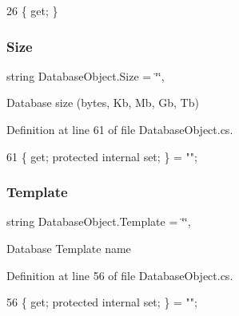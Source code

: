 \begin{DoxyCode}
26 \{ \textcolor{keyword}{get}; \}
\end{DoxyCode}
\mbox{\label{class_database_object_ad86f5dd95a9debdef284e21e32936e9e}} 
\subsubsection{\texorpdfstring{Size}{Size}}
{\footnotesize\ttfamily string Database\+Object.\+Size = \char`\"{}\char`\"{}\hspace{0.3cm}{\ttfamily [get]}, {\ttfamily [set]}}



Database size (bytes, Kb, Mb, Gb, Tb) 



Definition at line 61 of file Database\+Object.\+cs.


\begin{DoxyCode}
61 \{ \textcolor{keyword}{get}; \textcolor{keyword}{protected} \textcolor{keyword}{internal} \textcolor{keyword}{set}; \} = \textcolor{stringliteral}{""};
\end{DoxyCode}
\mbox{\label{class_database_object_ac8ecdbe9722c00f787a62aef7d3dfa5a}} 
\subsubsection{\texorpdfstring{Template}{Template}}
{\footnotesize\ttfamily string Database\+Object.\+Template = \char`\"{}\char`\"{}\hspace{0.3cm}{\ttfamily [get]}, {\ttfamily [set]}}



Database Template name 



Definition at line 56 of file Database\+Object.\+cs.


\begin{DoxyCode}
56 \{ \textcolor{keyword}{get}; \textcolor{keyword}{protected} \textcolor{keyword}{internal} \textcolor{keyword}{set}; \} = \textcolor{stringliteral}{""};
\end{DoxyCode}
\mbox{\label{class_database_object_a9af3f75274dd39f7fa82a355dc4ddf39}} 
